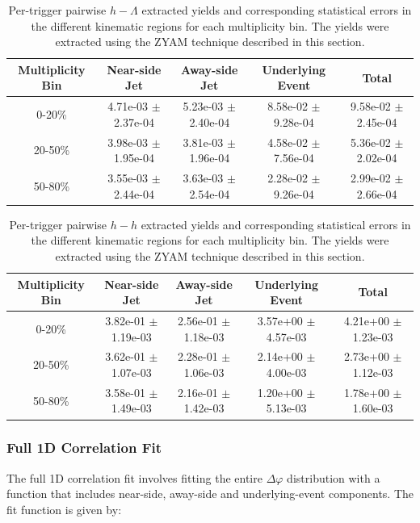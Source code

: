 \documentclass[ALICE,manyauthors]{ALICE_analysis_notes}
\begin{document}
\begin{table}[h!]
\centering
\begin{tabular}{| c | c | c | c | c | }
\hline
Multiplicity Bin & Near-side Jet & Away-side Jet & Underlying Event & Total  \\
\hline
	
0-20\% & 4.71e-03 $\pm$ 2.37e-04 & 5.23e-03 $\pm$ 2.40e-04 & 8.58e-02 $\pm$ 9.28e-04 & 9.58e-02 $\pm$ 2.45e-04 \\
20-50\% & 3.98e-03 $\pm$ 1.95e-04 & 3.81e-03 $\pm$ 1.96e-04 & 4.58e-02 $\pm$ 7.56e-04 & 5.36e-02 $\pm$ 2.02e-04 \\
50-80\% & 3.55e-03 $\pm$ 2.44e-04 & 3.63e-03 $\pm$ 2.54e-04 & 2.28e-02 $\pm$ 9.26e-04 & 2.99e-02 $\pm$ 2.66e-04 \\
	
\hline
\end{tabular}
\caption{Per-trigger pairwise $h-\Lambda$ extracted yields and corresponding statistical errors in the different kinematic regions for each multiplicity bin. The yields were extracted using the ZYAM technique described in this section.}
\label{h_lambda_yield_table_zyam}
\end{table}
	
\begin{table}[h!]
\centering
\begin{tabular}{| c | c | c | c | c | }
\hline
Multiplicity Bin & Near-side Jet & Away-side Jet & Underlying Event & Total  \\
\hline

0-20\% & 3.82e-01 $\pm$ 1.19e-03 & 2.56e-01 $\pm$ 1.18e-03 & 3.57e+00 $\pm$ 4.57e-03 & 4.21e+00 $\pm$ 1.23e-03 \\
20-50\% & 3.62e-01 $\pm$ 1.07e-03 & 2.28e-01 $\pm$ 1.06e-03 & 2.14e+00 $\pm$ 4.00e-03 & 2.73e+00 $\pm$ 1.12e-03 \\
50-80\% & 3.58e-01 $\pm$ 1.49e-03 & 2.16e-01 $\pm$ 1.42e-03 & 1.20e+00 $\pm$ 5.13e-03 & 1.78e+00 $\pm$ 1.60e-03 \\

\hline
\end{tabular}
\caption{Per-trigger pairwise $h-h$ extracted yields and corresponding statistical errors in the different kinematic regions for each multiplicity bin. The yields were extracted using the ZYAM technique described in this section.}
\label{h_h_yield_table_zyam}
\end{table}


\subsubsection{Full 1D Correlation Fit}
\label{full_correlation_fit}
The full 1D correlation fit involves fitting the entire $\Delta\varphi$ distribution with a function that includes near-side, away-side and underlying-event components. The fit function is given by:
\end{document}
